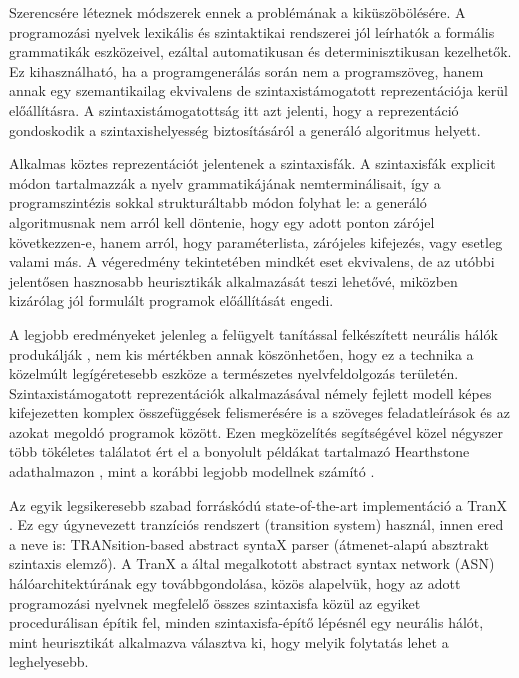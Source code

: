 \documentclass[twoside, 12pt]{report}
\begin{document}
Szerencsére léteznek módszerek ennek a problémának a kiküszöbölésére. A programozási nyelvek lexikális és szintaktikai rendszerei jól leírhatók a formális grammatikák eszközeivel, ezáltal automatikusan és determinisztikusan kezelhetők. Ez kihasználható, ha a programgenerálás során nem a programszöveg, hanem annak egy szemantikailag ekvivalens de szintaxistámogatott reprezentációja kerül előállításra. A szintaxistámogatottság itt azt jelenti, hogy a reprezentáció gondoskodik a szintaxishelyesség biztosításáról a generáló algoritmus helyett.

Alkalmas köztes reprezentációt jelentenek a szintaxisfák. A szintaxisfák explicit módon tartalmazzák a nyelv grammatikájának nemterminálisait, így a programszintézis sokkal strukturáltabb módon folyhat le: a generáló algoritmusnak nem arról kell döntenie, hogy egy adott ponton zárójel következzen-e, hanem arról, hogy paraméterlista, zárójeles kifejezés, vagy esetleg valami más. A végeredmény tekintetében mindkét eset ekvivalens, de az utóbbi jelentősen hasznosabb heurisztikák alkalmazását teszi lehetővé, miközben kizárólag jól formulált programok előállítását engedi.

A legjobb eredményeket jelenleg a felügyelt tanítással felkészített neurális hálók produkálják \parencite{KD19a}, nem kis mértékben annak köszönhetően, hogy ez a technika a közelmúlt legígéretesebb eszköze a természetes nyelvfeldolgozás területén. Szintaxistámogatott reprezentációk alkalmazásával némely fejlett modell képes kifejezetten komplex összefüggések felismerésére is a szöveges feladatleírások és az azokat megoldó programok között. Ezen megközelítés segítségével \textcite{RSK17a} közel négyszer több tökéletes találatot ért el a bonyolult példákat tartalmazó Hearthstone adathalmazon \parencite{Dee16b}, mint a korábbi legjobb modellnek számító \textcite{Lin+16a}.

Az egyik legsikeresebb szabad forráskódú state-of-the-art implementáció a TranX \parencite{YN18a}. Ez egy úgynevezett tranzíciós rendszert (transition system) használ, innen ered a neve is: TRANsition-based abstract syntaX parser (átmenet-alapú absztrakt szintaxis elemző). A TranX a \textcite{RSK17a} által megalkotott abstract syntax network (ASN) hálóarchitektúrának egy továbbgondolása, közös alapelvük, hogy az adott programozási nyelvnek megfelelő összes szintaxisfa közül az egyiket procedurálisan építik fel, minden szintaxisfa-építő lépésnél egy neurális hálót, mint heurisztikát alkalmazva választva ki, hogy melyik folytatás lehet a leghelyesebb.
\end{document}
